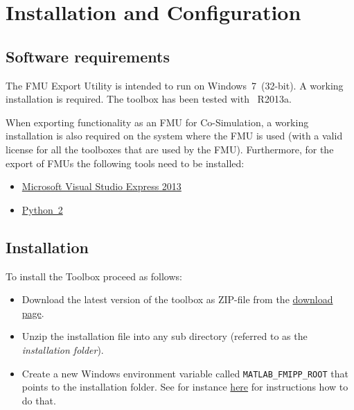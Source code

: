 \chapter{Installation and Configuration}

\section{Software requirements}

The \fmipp \matlab FMU Export Utility is intended to run on Windows~7~(32-bit).
A working \matlab installation is required.
The toolbox has been tested with \matlab~R2013a.


When exporting \matlab functionality as an FMU for Co-Simulation, a working \matlab installation is also required on the system where the FMU is used (with a valid license for all the \matlab toolboxes that are used by the FMU).
Furthermore, for the export of FMUs the following tools need to be installed:
\begin{itemize}

  \item \href{https://www.microsoft.com/en-us/download/details.aspx?id=44914}{Microsoft Visual Studio Express 2013}

  \item \href{https://www.python.org/}{Python~2}
  
\end{itemize}


\section{Installation}
\label{sec:install}

To install the \fmipp \matlab Toolbox proceed as follows:
\begin{itemize}
  \item Download the latest version of the toolbox as ZIP-file from the \href{https://sourceforge.net/projects/matlab-fmu/files/latest/download}{download page}.
  
  \item Unzip the installation file into any sub directory (referred to as the \emph{installation folder}).
  
  \item Create a new Windows environment variable called \texttt{MATLAB\_FMIPP\_ROOT} that points to the installation folder.
  See for instance \href{http://www.computerhope.com/issues/ch000549.htm}{here} for instructions how to do that.
\end{itemize}


